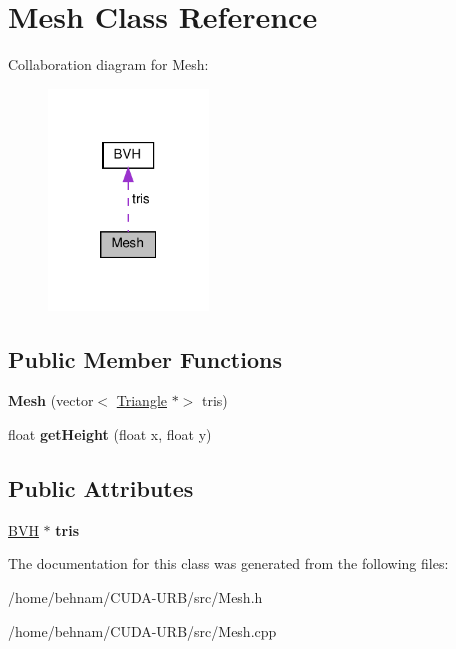 \hypertarget{classMesh}{}\section{Mesh Class Reference}
\label{classMesh}


Collaboration diagram for Mesh\+:
\nopagebreak
\begin{figure}[H]
\begin{center}
\leavevmode
\includegraphics[width=121pt]{classMesh__coll__graph}
\end{center}
\end{figure}
\subsection*{Public Member Functions}
\begin{DoxyCompactItemize}
\item 
\mbox{\label{classMesh_a5ac1070bda575410a98aa27a4f5e2951}} 
{\bfseries Mesh} (vector$<$ \hyperlink{classTriangle}{Triangle} $\ast$$>$ tris)
\item 
\mbox{\label{classMesh_a6ebe1c89c8b8c1ce48236547f48b014b}} 
float {\bfseries get\+Height} (float x, float y)
\end{DoxyCompactItemize}
\subsection*{Public Attributes}
\begin{DoxyCompactItemize}
\item 
\mbox{\label{classMesh_a8dbb906940e92cf062b9db91adeaa9ec}} 
\hyperlink{classBVH}{B\+VH} $\ast$ {\bfseries tris}
\end{DoxyCompactItemize}


The documentation for this class was generated from the following files\+:\begin{DoxyCompactItemize}
\item 
/home/behnam/\+C\+U\+D\+A-\/\+U\+R\+B/src/Mesh.\+h\item 
/home/behnam/\+C\+U\+D\+A-\/\+U\+R\+B/src/Mesh.\+cpp\end{DoxyCompactItemize}
